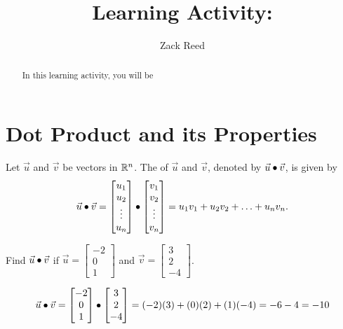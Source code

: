 \documentclass{ximera}
\author{Zack Reed}
\title{Learning Activity: }
\begin{document}
\begin{abstract}

    In this learning activity, you will be 
\end{abstract}
\maketitle

\section*{Dot Product and its Properties}
 
\begin{definition}\label{def:dotproduct}
  Let $\vec{u}$ and $\vec{v}$ be vectors in $\mathbb{R}^n$.  The  of $\vec{u}$ and $\vec{v}$, denoted by
  $\vec{u}\bullet \vec{v}$, is given by
  \begin{align*}
    \vec{u}\bullet\vec{v}=\begin{bmatrix}u_1\\u_2\\\vdots\\u_n\end{bmatrix}\bullet\begin{bmatrix}v_1\\v_2\\\vdots\\v_n\end{bmatrix}=u_1v_1+u_2v_2+\ldots+u_nv_n.
  \end{align*}
\end{definition}
 
\begin{example}\label{ex:dotex}
  Find $\vec{u}\bullet \vec{v}$ if
  $\vec{u}=\begin{bmatrix}-2\\0\\1\end{bmatrix}$ and
  $\vec{v}=\begin{bmatrix}3\\2\\-4\end{bmatrix}$.
 
  \begin{explanation}
    $$\vec{u}\bullet\vec{v}=\begin{bmatrix}-2\\0\\1\end{bmatrix}\bullet\begin{bmatrix}3\\2\\-4\end{bmatrix}=(-2)(3)+(0)(2)+(1)(-4)=-6-4=-10$$
  \end{explanation}
\end{example}
 
\end{document}
